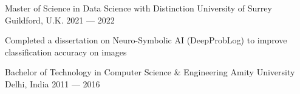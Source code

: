 
\begin{cventries}

  \cventry
  {Master of Science in Data Science with Distinction} %
  {University of Surrey} %
  {Guildford, U.K.} %
  {2021 --- 2022} %
  {
    \begin{cvitems} %
    \item {Completed a dissertation on Neuro-Symbolic AI (DeepProbLog) to improve classification accuracy on images}
    \end{cvitems}
  }

  \cventry
  {Bachelor of Technology in Computer Science \& Engineering} %
  {Amity University} %
  {Delhi, India} %
  {2011 --- 2016} %
  {}

\end{cventries}
